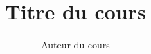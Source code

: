 
\usepackage{calc}
\usepackage{ifthen}
\usepackage{tikz}

\author{Auteur du cours}
\title{Titre du cours}
\date{}                    %



\maketitle{}               %
\vspace{2,5cm}



%


\newpage{}
\tableofcontents{}        %




